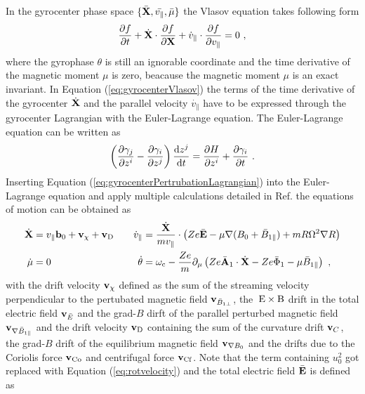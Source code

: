 In the gyrocenter phase space $\{\bar{\boldsymbol{\mathbf{X}}}, \bar{v_\parallel}, \bar{\mu}\}$ the Vlasov equation takes following form
\begin{gather}
	\frac{\partial f}{\partial t} + \dot{\boldsymbol{\mathbf{X}}} \cdot \frac{\partial f}{\partial \boldsymbol{\mathbf{X}}} + \dot{v}_\parallel \cdot \frac{\partial f}{\partial v_\parallel} = 0~,
	\label{eq:gyrocenterVlasov}
\end{gather}
where the gyrophase $\theta$ is still an ignorable coordinate and the time derivative of the magnetic moment $\mu$ is zero, beacause the magnetic moment $\mu$ is an exact invariant. In Equation (\ref{eq:gyrocenterVlasov}) the terms of the time derivative of the gyrocenter $\dot{\boldsymbol{\mathbf{X}}}$ and the parallel velocity $\dot{v_\parallel}$ have to be expressed through the gyrocenter Lagrangian with the Euler-Lagrange equation. The Euler-Lagrange equation can be written as 
\begin{gather}
	\left(\frac{\partial \gamma_j}{\partial z^i} - \frac{\partial \gamma_i}{\partial z^j}\right) \frac{\mathrm{d}z^j}{\mathrm{d}t} = \frac{\partial H}{\partial z^i} + \frac{\partial \gamma_i}{\partial t}~.
	\label{eq:eulerLagrange}
\end{gather}
Inserting Equation (\ref{eq:gyrocenterPertrubationLagrangian}) into the Euler-Lagrange equation and apply multiple calculations detailed in Ref.  the equations of motion can be obtained as
\begin{gather}
	\begin{aligned}
		\dot{\boldsymbol{\mathbf{X}}} &= v_\parallel\boldsymbol{\mathbf{b}}_0 + \boldsymbol{\mathbf{v}}_\chi + \boldsymbol{\mathbf{v}}_\mathrm{D} &\quad \dot{v}_\parallel &= \frac{\dot{\boldsymbol{\mathbf{X}}}}{mv_\parallel} \cdot \left( Ze \bar{\boldsymbol{\mathbf{E}}} -\mu\nabla (B_0 + \bar{B}_{1\parallel}) + mR \Omega^2 \nabla R \right) \\
		\dot{\mu} &= 0  &\quad \dot{\theta} &= \omega_\mathrm{c} - \frac{Ze}{m} \partial_\mu \left(Ze\bar{\boldsymbol{\mathbf{A}}}_1 \cdot \dot{\boldsymbol{\mathbf{X}}} - Ze\bar{\Phi}_1 - \mu\bar{B}_{1\parallel}\right)~,
	\end{aligned}
	\label{eq:motionEquation}
\end{gather}
with the drift velocity $\boldsymbol{\mathbf{v}}_\chi$ defined as the sum of the streaming velocity perpendicular to the pertubated magnetic field $\boldsymbol{\mathbf{v}}_{\bar{B}_{1\perp}}$, the $\mathrm{\:E}\times\mathrm{B}$ drift in the total electric field $\boldsymbol{\mathbf{v}}_{\bar{E}}$ and the grad-$B$ dirft of the parallel perturbed magnetic field $\boldsymbol{\mathbf{v}}_{\nabla \bar{B}_{1\parallel}}$ and the drift velocity $\boldsymbol{\mathbf{v}}_\mathrm{D}$ containing the sum of the curvature drift $\boldsymbol{\mathbf{v}}_C$, the grad-$B$ drift of the equilibrium magnetic field $\boldsymbol{\mathbf{v}}_{\nabla B_0}$ and the drifts due to the Coriolis force $\boldsymbol{\mathbf{v}}_\mathrm{Co}$ and centrifugal force $\boldsymbol{\mathbf{v}}_\mathrm{Cf}$. Note that the term containing $u_0^2$ got replaced with Equation (\ref{eq:rotvelocity}) and the total electric field $\bar{\boldsymbol{\mathbf{E}}}$ is defined as 
